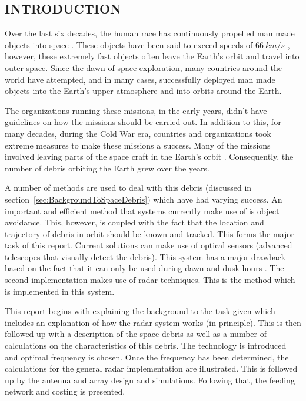 \documentclass[11pt]{witseiepaper}
\begin{document}
\begin{bibunit}[witseie]
\tableofcontents

\listoffigures

\listoftables

\onecolumn
\clearpage
{}


\section{INTRODUCTION} \label{sec:INTRODUCTION}

Over the last six decades, the human race has continuously propelled man made objects into space \cite{sputnik}. These objects have been said to exceed speeds of $66~km/s$ \cite{fastestObject}, however, these extremely fast objects often leave the Earth's orbit and travel into outer space. Since the dawn of space exploration, many countries around the world have attempted, and in many cases, successfully deployed man made objects into the Earth's upper atmosphere and into orbits around the Earth.

The organizations running these missions, in the early years, didn't have guidelines on how the missions should be carried out. In addition to this, for many decades, during the Cold War era, countries and organizations took extreme measures to make these missions a success. Many of the missions involved leaving parts of the space craft in the Earth's orbit \cite{spaceDebrisGuide}. Consequently, the number of debris orbiting the Earth grew over the years.

A number of methods are used to deal with this debris (discussed in section~\ref{sec:BackgroundToSpaceDebris}) which have had varying success.
An important and efficient method that systems currently make use of is object avoidance. This, however, is coupled with the fact that the location and trajectory of debris in orbit should be known and tracked. This forms the major task of this report.
Current solutions can make use of optical sensors (advanced telescopes that visually detect the debris). This system has a major drawback based on the fact that it can only be used during dawn and dusk hours \cite{OrbitalDebrisTechnicalAssessment,telescope,ZenithRanging}.
The second implementation makes use of radar techniques. This is the method which is implemented in this system.

This report begins with explaining the background to the task given which includes an explanation of how the radar system works (in principle). This is then followed up with a description of the space debris as well as a number of calculations on the characteristics of this debris. The technology is introduced and optimal frequency is chosen. Once the frequency has been determined, the calculations for the general radar implementation are illustrated.
This is followed up by the antenna and array design and simulations. Following that, the feeding network and costing is presented.




\end{bibunit}
\end{document}
